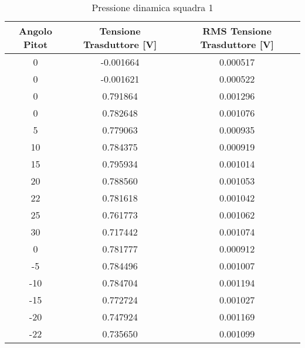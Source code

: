 \begin{table}[h!]
\centering
\begin{tabular}{|c|c|c|}
\hline
Angolo Pitot & Tensione Trasduttore {[}V{]} & RMS Tensione Trasduttore {[}V{]} \\ \hline
0            & -0.001664                    & 0.000517                         \\ \hline
0            & -0.001621                    & 0.000522                         \\ \hline
0            & 0.791864                     & 0.001296                         \\ \hline
0            & 0.782648                     & 0.001076                         \\ \hline
5            & 0.779063                     & 0.000935                         \\ \hline
10           & 0.784375                     & 0.000919                         \\ \hline
15           & 0.795934                     & 0.001014                         \\ \hline
20           & 0.788560                     & 0.001053                         \\ \hline
22           & 0.781618                     & 0.001042                         \\ \hline
25           & 0.761773                     & 0.001062                         \\ \hline
30           & 0.717442                     & 0.001074                         \\ \hline
0            & 0.781777                     & 0.000912                         \\ \hline
-5           & 0.784496                     & 0.001007                         \\ \hline
-10          & 0.784704                     & 0.001194                         \\ \hline
-15          & 0.772724                     & 0.001027                         \\ \hline
-20          & 0.747924                     & 0.001169                         \\ \hline
-22          & 0.735650                     & 0.001099                         \\ \hline
\end{tabular}
\caption{Pressione dinamica squadra 1}
\end{table}

